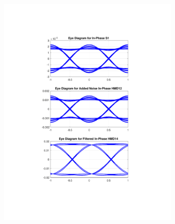\begin{figure}[H]
	\centering
	\begin{subfigure}{.45\textwidth}
		\centering
		\includegraphics[clip, trim=5cm 4cm 5cm 4cm, width=\textwidth]{./sdf/m_qam_system/figures/eyes/if_nn_p_60_09.pdf}
	\end{subfigure}
	\begin{subfigure}{.45\textwidth}
		\centering

\end{subfigure}
\end{figure}
